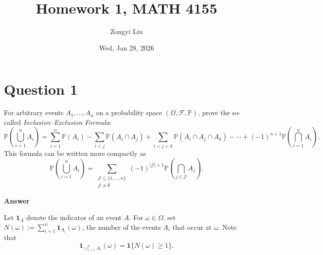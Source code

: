 \documentclass[letterpaper]{article}
\title{Homework 1, MATH 4155}
\author{Zongyi Liu}
\date{Wed, Jan 28, 2026}
\begin{document}
		\maketitle
		
		\section{Question 1}
		
		For arbitrary events $A_1,\dots,A_n$ on a probability space $(\Omega,\mathcal{F},\mathbb{P})$, prove the so-called \emph{Inclusion--Exclusion Formula}:
		\[
		\mathbb{P}\!\left( \bigcup_{i=1}^n A_i \right)
		= \sum_{i=1}^n \mathbb{P}(A_i)
		- \sum_{i<j} \mathbb{P}(A_i \cap A_j)
		+ \sum_{i<j<k} \mathbb{P}(A_i \cap A_j \cap A_k)
		- \cdots
		+ (-1)^{n+1} \mathbb{P}\!\left( \bigcap_{i=1}^n A_i \right).
		\]
		This formula can be written more compactly as
		\[
		\mathbb{P}\!\left( \bigcup_{i=1}^n A_i \right)
		=
		\sum_{\substack{\mathcal{J} \subseteq \{1,\dots,n\} \\ \mathcal{J} \neq \emptyset}}
		(-1)^{|\mathcal{J}|+1}
		\mathbb{P}\!\left( \bigcap_{j \in \mathcal{J}} A_j \right).
		\]
		
		\textbf{Answer}
		
			Let $\mathbf{1}_A$ denote the indicator of an event $A$. For $\omega\in\Omega$, set
			$N(\omega):=\sum_{i=1}^n \mathbf{1}_{A_i}(\omega)$, the number of the events $A_i$
			that occur at $\omega$. Note that
			\[
			\mathbf{1}_{\cup_{i=1}^n A_i}(\omega)=\mathbf{1}\{N(\omega)\ge 1\}.
			\]
			
\end{document}
